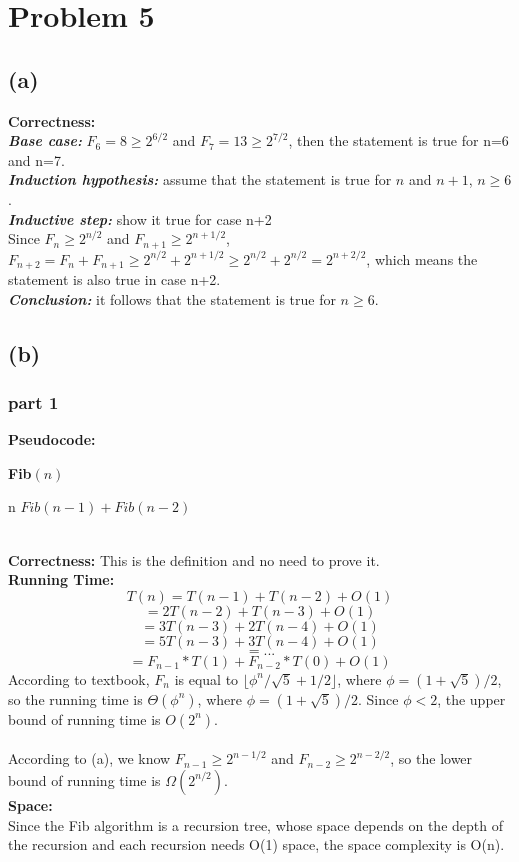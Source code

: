 \documentclass[twoside]{homework}
\begin{document}
\section*{Problem 5}
\subsection*{(a)}
\textbf{Correctness:} \quad
\\\textbf{\emph{Base case:}}  $F_6 = 8\ge 2^{6/2}$ and $F_7 = 13\ge 2^{7/2}$, then the statement is true for n=6 and n=7.
\\\textbf{\emph{Induction hypothesis:}} assume that the statement is true for $n$ and $n+1$, $n\ge 6$.
\\\textbf{\emph{Inductive step:}} show it true for case n+2
\\Since $F_n\ge 2^{n/2}$ and $F_{n+1}\ge 2^{n+1/2}$,  
\\$F_{n+2}=F_{n}+F_{n+1}\ge 2^{n/2}+ 2^{n+1/2}\ge 2^{n/2}+ 2^{n/2}=2^{n+2/2}$, which means the statement is also true in case n+2.
\\\textbf{\emph{Conclusion:}} 
it follows that the statement is true for $n\ge 6$.
\subsection*{(b)}
\subsubsection*{part 1} 
\textbf{Pseudocode:} \quad
\begin{algorithm}
	\caption*{\textbf{Fib}$(n)$}
	\begin{algorithmic}
		\RETURN n
		\ENDIF
		\RETURN $Fib(n-1)+Fib(n-2)$
	\end{algorithmic}		
\end{algorithm}
\\\textbf{Correctness:} \quad
This is the definition and no need to prove it.
\\\textbf{Running Time:} \quad
\\$$T(n) = T(n-1)+T(n-2)+O(1)$$
$$=2T(n-2)+T(n-3)+O(1)$$
$$=3T(n-3)+2T(n-4)+O(1)$$
$$=5T(n-3)+3T(n-4)+O(1)$$
$$=...$$
$$=F_{n-1}*T(1)+F_{n-2}*T(0)+O(1)$$
According to textbook, $F_n$ is equal to $\lfloor\phi^n/\sqrt{5}+1/2\rfloor$, where $\phi=(1+\sqrt{5})/2$, so the running time is $\Theta(\phi^n)$, where $\phi=(1+\sqrt{5})/2$. Since $\phi<2$, the upper bound of running time is $O(2^n)$.\\
\\According to (a), we know $F_{n-1}\ge 2^{n-1/2}$ and $F_{n-2}\ge 2^{n-2/2}$, so the lower bound of running time is $\Omega(2^{n/2})$.
\\\textbf{Space:} \quad
\\Since the Fib algorithm is a recursion tree, whose space depends on the depth of the recursion and each recursion needs O(1) space, the space complexity is O(n).
\end{document}
